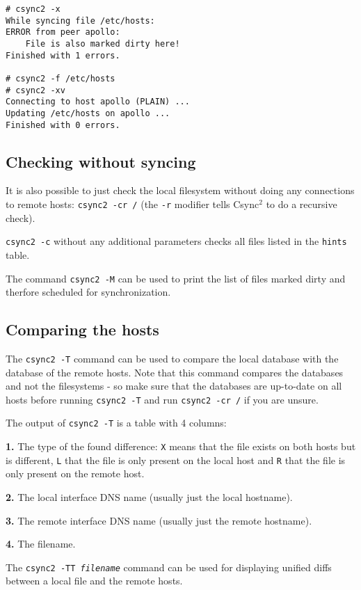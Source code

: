 \documentclass[a4paper,twocolumn]{article}
\def\csync2{{\sc Csync$^{2}$}}
\begin{document}
\begin{verbatim}
# csync2 -x
While syncing file /etc/hosts:
ERROR from peer apollo:
    File is also marked dirty here!
Finished with 1 errors.

# csync2 -f /etc/hosts
# csync2 -xv
Connecting to host apollo (PLAIN) ...
Updating /etc/hosts on apollo ...
Finished with 0 errors.
\end{verbatim}

\subsection{Checking without syncing}

It is also possible to just check the local filesystem without doing any
connections to remote hosts: {\tt csync2 -cr /} (the {\tt -r} modifier
tells \csync2 to do a recursive check).

{\tt csync2 -c} without any additional parameters checks all files listed
in the {\tt hints} table.

The command {\tt csync2 -M} can be used to print the list of files marked dirty
and therfore scheduled for synchronization.

\subsection{Comparing the hosts}

The {\tt csync2 -T} command can be used to compare the local database with the
database of the remote hosts. Note that this command compares the databases and
not the filesystems - so make sure that the databases are up-to-date on all
hosts before running {\tt csync2 -T} and run {\tt csync2 -cr /} if you are
unsure.

The output of {\tt csync2 -T} is a table with 4 columns:

{\bf 1.} The type of the found difference: {\tt X} means that the file exists
on both hosts but is different, {\tt L} that the file is only present on the
local host and {\tt R} that the file is only present on the remote host.

{\bf 2.} The local interface DNS name (usually just the local hostname).

{\bf 3.} The remote interface DNS name (usually just the remote hostname).

{\bf 4.} The filename.

The {\tt csync2 -TT {\it filename}} command can be used for displaying unified
diffs between a local file and the remote hosts.
\end{document}
